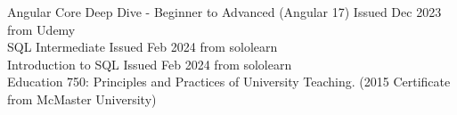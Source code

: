 

\begin{cvparagraph}
\begin{center}
	Angular Core Deep Dive - Beginner to Advanced (Angular 17) Issued Dec 2023 from Udemy\\
	SQL Intermediate Issued Feb 2024 from sololearn\\
	Introduction to SQL Issued Feb 2024 from sololearn\\
	Education 750: Principles and Practices of University Teaching. (2015 Certificate from McMaster University)
\end{center}%
\end{cvparagraph}